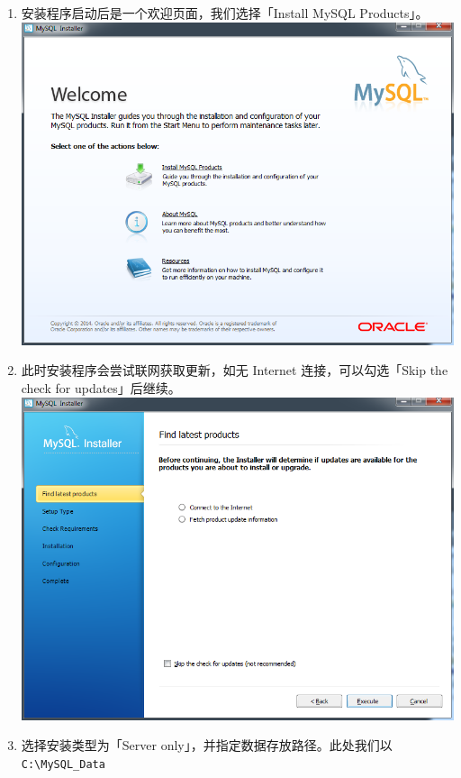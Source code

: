 \begin{enumerate}
\def\labelenumi{\arabic{enumi}.}
\itemsep1pt\parskip0pt
\item
  安装程序启动后是一个欢迎页面，我们选择「Install MySQL Products」。
  \includegraphics{img/mysql_1.png}
\item
  此时安装程序会尝试联网获取更新，如无 Internet 连接，可以勾选「Skip the
  check for updates」后继续。 \includegraphics{img/mysql_2.png}
\item
  选择安装类型为「Server only」，并指定数据存放路径。此处我们以
  \texttt{C:\textbackslash{}MySQL\_Data}

\end{enumerate}
